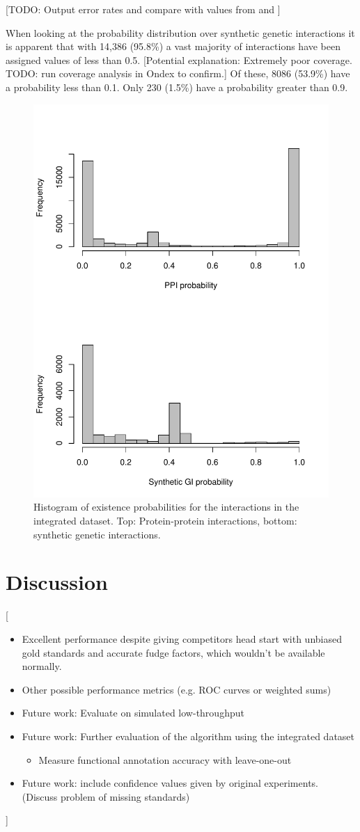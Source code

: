 \documentclass{bioinfo}
\newcommand{\note}[1]{{\color{red}[#1]}}
\begin{document}
\note{TODO: Output error rates and compare with values from \citep{dhaeseleer_estimating_2004} and \citep{hart_how_2006}} 

When looking at the probability distribution over synthetic genetic interactions it is apparent that with 14,386 (95.8\%) a vast majority of interactions have been assigned values of less than 0.5. \note{Potential explanation: Extremely poor coverage. TODO: run coverage analysis in Ondex to confirm.} Of these, 8086 (53.9\%) have a probability less than 0.1. Only 230 (1.5\%) have a probability greater than 0.9.



\begin{figure}[!tpb]
\centerline{\includegraphics[width=.5\textwidth]{fig2.pdf}}
\caption{Histogram of existence probabilities for the interactions in the integrated dataset. Top: Protein-protein interactions, bottom: synthetic genetic interactions.}
\label{ppi+gi}
\end{figure}


\section{Discussion}
\note{
\begin{itemize}
  \item Excellent performance despite giving competitors head start with unbiased gold standards and accurate fudge factors, which wouldn't be available normally.
  \item Other possible performance metrics (e.g. ROC curves or weighted sums)
  \item Future work: Evaluate on simulated low-throughput
  \item Future work: Further evaluation of the algorithm using the integrated dataset
  \begin{itemize}
    \item Measure functional annotation accuracy with leave-one-out
  \end{itemize}
  \item Future work: include confidence values given by original experiments. (Discuss problem of missing standards)
\end{itemize}
}
\end{document}
